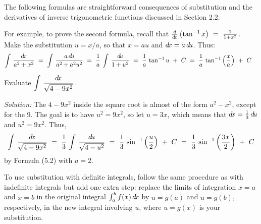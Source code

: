 The following formulas are straightforward consequences of substitution and the
derivatives of inverse trigonometric functions discussed in Section 2.2:
\newpage
{}

For example, to prove the second formula, recall that
$\frac{d}{d\!x}\left(\tan^{-1}x\right) ~=~ \frac{1}{1 + x^2}$. Make the substitution
$u = x/a$, so that $x = au$ and $d\!x= a\,d\!u$. Thus:
\[
\int\,\frac{d\!x}{a^2 + x^2} ~=~ \int\,\frac{a\,d\!u}{a^2 + a^2 u^2} ~=~
\frac{1}{a}\,\int\,\frac{d\!u}{1 + u^2} ~=~
\frac{1}{a}\,\tan^{-1}u ~+~ C ~=~
\frac{1}{a}\,\tan^{-1}\left(\frac{x}{a}\right) ~+~ C \quad\relax
\]

\begin{exmp}\label{exmp:subst10}
\noindent Evaluate $\displaystyle\int\,\dfrac{d\!x}{\sqrt{4 - 9x^2}}$.\vspace{1mm}
\par\noindent\emph{Solution:} The $4 - 9x^2$ inside the square root is almost of
the form $a^2 - x^2$, except for the 9. The goal is to have $u^2 = 9x^2$, so let
$u = 3x$, which means that $d\!x = \frac{1}{3}\,d\!u$ and $u^2 = 9x^2$. Thus,
\[
\int\,\dfrac{d\!x}{\sqrt{4 - 9x^2}} ~=~ \frac{1}{3}\,\int\,\dfrac{d\!u}{\sqrt{4 - u^2}}
~=~ \frac{1}{3}\,\sin^{-1}\left(\frac{u}{2}\right) ~+~ C ~=~
\frac{1}{3}\,\sin^{-1}\left(\frac{3x}{2}\right) ~+~ C
\]
by Formula (5.2) with $a = 2$.
\end{exmp}
\divider
\vspace{3mm}

To use substitution with definite integrals, follow the same procedure as with
indefinite integrals but add one extra step: replace the limits of integration
$x=a$ and $x=b$ in the original integral $\int_a^b f(x)\,d\!x$ by $u = g(a)$ and
$u= g(b)$, respectively, in the new integral involving $u$, where $u=g(x)$ is
your substitution.

